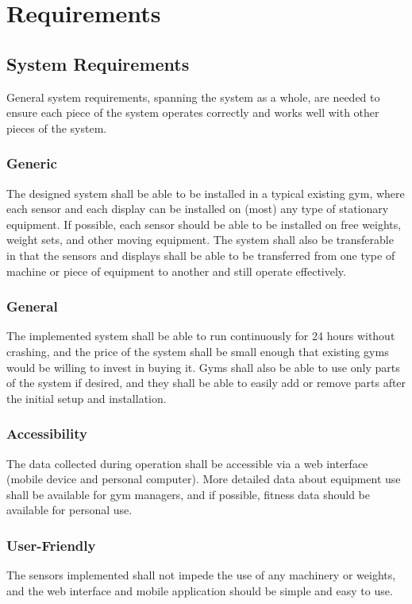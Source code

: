 \documentclass[PPFS.tex]{template/subfiles}
\begin{document}
\section{Requirements}

\subsection{System Requirements}
General system requirements, spanning the system as a whole, are needed to ensure each piece of the system operates correctly and works well with other pieces of the system.

\subsubsection{Generic}
The designed system shall be able to be installed in a typical existing gym, where each sensor and each display can be installed on (most) any type of stationary equipment. If possible, each sensor should be able to be installed on free weights, weight sets, and other moving equipment. The system shall also be transferable in that the sensors and displays shall be able to be transferred from one type of machine or piece of equipment to another and still operate effectively.

\subsubsection{General}
The implemented system shall be able to run continuously for 24 hours without crashing, and the price of the system shall be small enough that existing gyms would be willing to invest in buying it. Gyms shall also be able to use only parts of the system if desired, and they shall be able to easily add or remove parts after the initial setup and installation.

\subsubsection{Accessibility}
The data collected during operation shall be accessible via a web interface (mobile device and personal computer). More detailed data about equipment use shall be available for gym managers, and if possible, fitness data should be available for personal use.

\subsubsection{User-Friendly}
The sensors implemented shall not impede the use of any machinery or weights, and the web interface and mobile application should be simple and easy to use.
\end{document}
